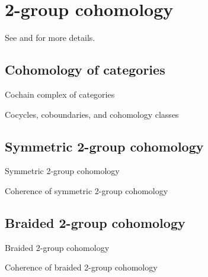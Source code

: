 \chapter{2-group cohomology}

See \cite{picard} and \cite{kkg} for more details.

\section{Cohomology of categories}

\begin{defn} Cochain complex of categories \end{defn}

\begin{defn} Cocycles, coboundaries, and cohomology classes \end{defn}

\section{Symmetric 2-group cohomology}

\begin{defn} Symmetric 2-group cohomology \end{defn}

\begin{prop} Coherence of symmetric 2-group cohomology \end{prop}

\section{Braided 2-group cohomology}

\begin{defn} Braided 2-group cohomology \end{defn}

\begin{prop} Coherence of braided 2-group cohomology \end{prop} 
 